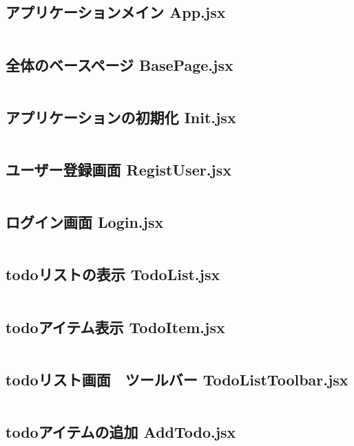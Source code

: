\documentclass[paper=a4paper, fontsize=10pt, head_space=10mm, foot_space=17mm, gutter=17mm, line_length=185mm, twoside]{jlreq}
\begin{document}
\subsection {アプリケーションメイン App.jsx}
\inputminted[linenos, breaklines]{jsx}{src-react/App.jsx}
\clearpage

\subsection {全体のベースページ BasePage.jsx}
\inputminted[linenos, breaklines]{jsx}{src-react/BasePage.jsx}
\clearpage

\subsection {アプリケーションの初期化 Init.jsx}
\inputminted[linenos, breaklines]{jsx}{src-react/Init.jsx}
\clearpage

\subsection {ユーザー登録画面 RegistUser.jsx}
\inputminted[linenos, breaklines]{jsx}{src-react/RegistUser.jsx}
\clearpage

\subsection {ログイン画面 Login.jsx}
\inputminted[linenos, breaklines]{jsx}{src-react/Login.jsx}
\clearpage

\subsection {todoリストの表示 TodoList.jsx}
\inputminted[linenos, breaklines]{jsx}{src-react/TodoList.jsx}
\clearpage

\subsection {todoアイテム表示 TodoItem.jsx}
\inputminted[linenos, breaklines]{jsx}{src-react/TodoItem.jsx}
\clearpage

\subsection {todoリスト画面　ツールバー TodoListToolbar.jsx} 
\inputminted[linenos, breaklines]{jsx}{src-react/TodoListToolbar.jsx}
\clearpage

\subsection {todoアイテムの追加 AddTodo.jsx}
\inputminted[linenos, breaklines]{jsx}{src-react/AddTodo.jsx}
\clearpage
\end{document}
